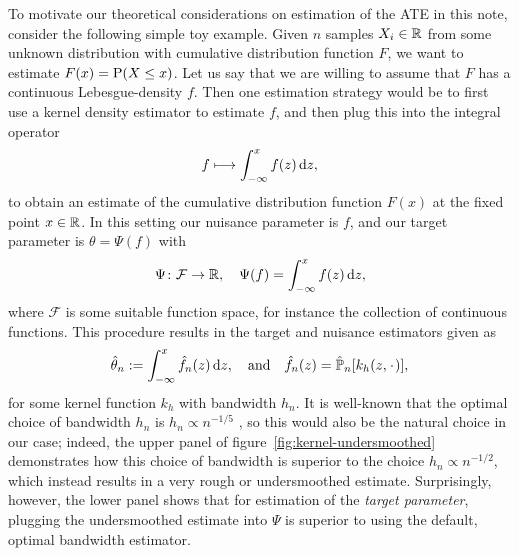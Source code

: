 \documentclass[a4,danish]{article}
\newcommand\xqed[1]{%
  \leavevmode\unskip\penalty9999 \hbox{}\nobreak\hfill
  \quad\hbox{#1}}
\newcommand\xend{\xqed{\(\bullet\)}}
\begin{document}
To motivate our theoretical considerations on estimation of the ATE in
this note, consider the following simple toy example. Given $n$
samples $X_i \in \R$ from some unknown distribution with cumulative
distribution function $F$, we want to estimate $F(x) = \P(X \leq x)$.
Let us say that we are willing to assume that $F$ has a continuous
Lebesgue-density $f$. Then one estimation strategy would be to first
use a kernel density estimator to estimate $f$, and then plug this
into the integral operator
  \begin{equation*}
    f \longmapsto \int_{-\infty}^x f(z) \diff z,
  \end{equation*}
  to obtain an estimate of the cumulative distribution function $F(x)$ at the fixed point
  $x \in \R$. In this setting our nuisance parameter is $f$, and our target parameter is
  $\theta = \Psi(f)$ with
  \begin{equation*}
    \Psi \colon \mathcal{F} \rightarrow \R, \quad \Psi(f) = \int_{-\infty}^x f(z) \diff z,
  \end{equation*}
  where $\mathcal{F}$ is some suitable function space, for instance the collection of continuous
  functions. This procedure results in the target and nuisance estimators given as
  \begin{equation}
    \hat{\theta}_n := \int_{-\infty}^x \hat{f}_n(z)  \diff z,
    \quad \text{and} \quad
    \hat{f}_n(z) = \empmeas[k_h(z, \blank)],
  \end{equation}
  for some kernel function $k_h$ with bandwidth $h_n$. It is
  well-known that the optimal choice of bandwidth $h_n$ is
  $h_n \propto n^{-1/5}$ \citep{wasserman2006all}, so this would also
  be the natural choice in our case; indeed, the upper panel of
  figure~\ref{fig:kernel-undersmoothed} demonstrates how this choice
  of bandwidth is superior to the choice $h_n \propto n^{-1/2}$, which
  instead results in a very rough or undersmoothed
  estimate. Surprisingly, however, the lower panel shows that for
  estimation of the \textit{target parameter}, plugging the
  undersmoothed estimate into $\Psi$ is superior to using the default,
  optimal bandwidth estimator.   %
\end{document}
